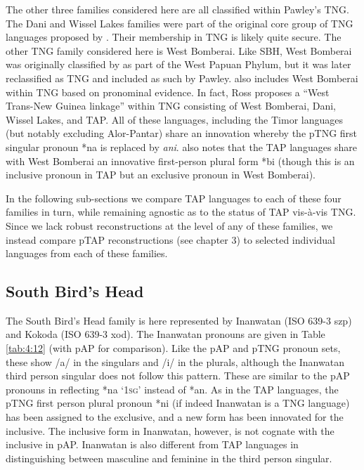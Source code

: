 The other three families considered here are all classified within Pawley's TNG. The Dani and Wissel Lakes families were part of the original core group of TNG languages proposed by \citet{WurmEtAl1975}. Their membership in TNG is likely quite secure. The other TNG family considered here is West Bomberai. Like SBH, West Bomberai was originally classified by \citet{Cowan1957} as part of the West Papuan Phylum, but it was later reclassified as TNG and included as such by Pawley. \citet{Ross2005} also includes West Bomberai within TNG based on pronominal evidence. In fact, Ross proposes a ``West Trans-New Guinea linkage'' within TNG consisting of West Bomberai, Dani, Wissel Lakes, and TAP. All of these languages, including the Timor languages (but notably excluding Alor-Pantar) share an innovation whereby the pTNG first singular pronoun *na is replaced by \textit{ani}. \citet[37]{Ross2005} also notes that the TAP languages share with West Bomberai an innovative first-person plural form *bi (though this is an inclusive
pronoun in TAP but an exclusive pronoun in West Bomberai).

In the following sub-sections we compare TAP languages to each of these four families in turn, while remaining agnostic as to the status of TAP vis-\`a-vis TNG. Since we lack robust reconstructions at the level of any of these families, we instead compare pTAP reconstructions (see chapter 3) to selected individual languages from each of these families.

\subsection{South Bird's Head}
The South Bird's Head family is here represented by Inanwatan (ISO 639-3 szp) and Kokoda (ISO 639-3 xod). The Inanwatan pronouns are given in Table \ref{tab:4:12} (with pAP for comparison). Like the pAP and pTNG pronoun sets, these show /a/ in the singulars and /i/ in the plurals, although the Inanwatan third person singular does not follow this pattern. These are similar to the pAP pronouns in reflecting *na `\textsc{1sg}' instead of *an. As in the TAP languages, the pTNG first person plural pronoun *ni (if indeed Inanwatan is a TNG language) has been assigned to the exclusive, and a new form has been innovated for the inclusive. The inclusive form in Inanwatan, however, is not cognate with the inclusive in pAP. Inanwatan is also different from TAP languages in distinguishing between masculine and feminine in the third person singular.


